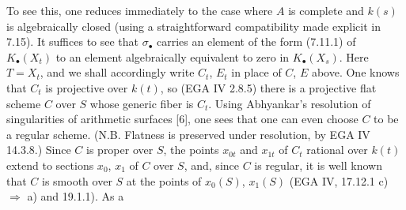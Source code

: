 To see this, one reduces immediately to the case where \(A\) is complete and \(k(s)\) is algebraically closed (using a straightforward compatibility made explicit in 7.15). It suffices to see that \(\sigma_\bullet\) carries an element of the form (7.11.1) of \(K_\bullet(X_t)\) to an element algebraically equivalent to zero in \(K_\bullet(X_s)\). Here \(T=X_t\), and we shall accordingly write \(C_t\), \(E_t\) in place of \(C\), \(E\) above. One knows that \(C_t\) is projective over \(k(t)\), so (EGA IV 2.8.5) there is a projective flat scheme \(C\) over \(S\) whose generic fiber is \(C_t\). Using Abhyankar's resolution of singularities of arithmetic surfaces [6], one sees that one can even choose \(C\) to be a regular scheme. (N.B. Flatness is preserved under resolution, by EGA IV 14.3.8.) Since \(C\) is proper over \(S\), the points \(x_{0t}\) and \(x_{1t}\) of \(C_t\) rational over \(k(t)\) extend to sections \(x_0\), \(x_1\) of \(C\) over \(S\), and, since \(C\) is regular, it is well known that \(C\) is smooth over \(S\) at the points of \(x_0(S)\), \(x_1(S)\) (EGA IV, 17.12.1 c) \(\Rightarrow\) a) and 19.1.1). As a 